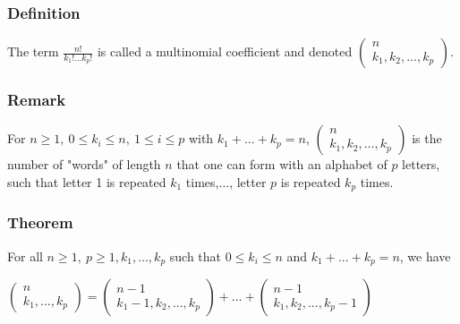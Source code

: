             \subsubsection{Definition}
                The term $\frac{n!}{k_1!...k_p!}$ is called a multinomial coefficient and denoted 
                $\left( \begin{array}{c}
                    n \\ k_1, k_2,...,k_p
                \end{array} \right)$.

            \subsubsection{Remark}
                For $n\geq 1, \: 0 \leq k_i \leq n, \: 1 \leq i \leq p$ with $k_1+...+k_p=n$, $\left( \begin{array}{c}
                    n \\ k_1, k_2, ..., k_p
                \end{array} \right)$ is the number of "words" of length $n$ that one can form with an alphabet of $p$ letters, such that letter 1 is repeated $k_1$ times,..., letter $p$ is repeated $k_p$ times.

            \subsubsection{Theorem}
                For all $n \geq 1, \: p \geq 1, k_1,...,k_p$ such that $0\leq k_i \leq n$ and $k_1+...+k_p = n$, we have
                
                \vspace{6pt}
                
                \centerline{$
                    \left( \begin{array}{c} n \\ k_1,...,k_p \end{array} \right) = 
                    \left( \begin{array}{c} n-1 \\ k_1 -1,k_2, ..., k_p \end{array} \right) +
                    \hdots +
                    \left( \begin{array}{c} n-1 \\ k_1, k_2, ..., k_p -1 \end{array} \right)
                $}